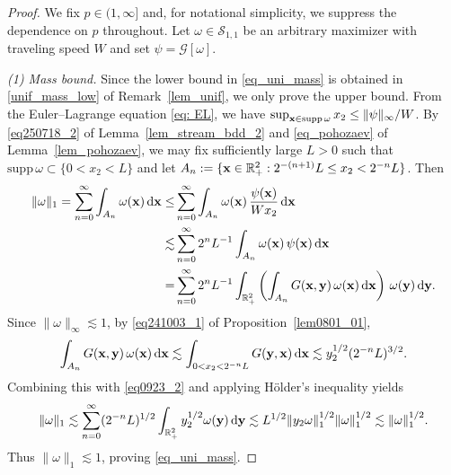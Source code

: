 \documentclass[11pt]{amsart}
\theoremstyle{definition}
\theoremstyle{definition}
\numberwithin{equation}{section}
\newcommand{\set}[1]{\{#1\}}
\newcommand{\supp}{{\mathrm{supp}}\,}
\newcommand{\0}{\emptyset}
\newcommand{\omg}{\omega}
\newcommand{\bfx}{{\bf x}}
\newcommand{\bfy}{{\bf y}}
\newcommand{\bbR}{\mathbb R}
\newcommand{\calG}{\mathcal G}
\newcommand{\calS}{\mathcal S}
\newcommand{\dd}{\mathrm{d}}
\begin{document}
			\begin{proof}
				We fix $p \in (1, \infty]$ and,
                for notational simplicity, we suppress the dependence on $p$ throughout.
				Let $\omega \in \calS_{1, 1}$ be an arbitrary maximizer with traveling speed $W$ and set $\psi = \calG[\omega]$.
				
				\medskip
				
				
				\noindent \textit{(1) Mass bound.}
				Since the lower bound in \eqref{eq_uni_mass} is obtained in \eqref{unif_mass_low} of Remark~\ref{lem_unif}, we only prove the upper bound.
                {
                From the Euler--Lagrange equation \eqref{eq: EL}, we have $\sup_{\bfx \in \supp \omega} x_2 \le \|\psi\|_{\infty}/W$.
                By \eqref{eq250718_2} of Lemma~\ref{lem_stream_bdd_2} and \eqref{eq_pohozaev} of Lemma~\ref{lem_pohozaev}, we may fix sufficiently large $L > 0$ such that $\supp\omg\subset\set{0<x_2<L}$ and}
				 let $A_n := \{ \bfx \in \bbR^2_+:  2^{-(n+1)}L \le  x_2  < 2^{-n}L \}$.
				Then
				\begin{equation}
					\label{eq0923_2}
					\begin{aligned}
						\| \omega\|_1
						= \sum_{n = 0}^{\infty} \int_{ A_n } \omega(\bfx) \, \dd\bfx  
						\le  &\sum_{n = 0}^{\infty} \int_{ A_n } \omega(\bfx) \,  \frac{\psi(\bfx)}{Wx_2}\, \dd\bfx \\
						\lesssim &\sum_{n = 0}^{\infty} 2^n L^{-1} \int_{ A_n } \omega(\bfx) \, \psi(\bfx)\, \dd\bfx \\
						= &\sum_{n = 0}^{\infty} 2^n L^{-1}  \int_{\bbR^2_+}  \left( \int_{A_n }G(\bfx, \bfy) \, \omega(\bfx)  \, \dd\bfx  \right) \,\omega(\bfy) \, \dd\bfy.
					\end{aligned}
				\end{equation}
				Since $\|\omega\|_{\infty} \lesssim 1$, by \eqref{eq241003_1} of Proposition~\ref{lem0801_01},
				\begin{align*}
					\int_{A_n }G(\bfx, \bfy) \, \omega(\bfx)  \, \dd\bfx \lesssim  \int_{0 < x_2  < 2^{-n}L }G(\bfy, \bfx) \, \dd\bfx 
					\lesssim y_2^{1/2} (2^{-n}L)^{3/2}.
				\end{align*}
				Combining this with \eqref{eq0923_2} and applying H\"older's inequality yields
				\[
				\|\omega\|_1 \lesssim \sum_{n = 0}^{\infty} (2^{-n}L)^{1/2} \int_{\bbR^2_+} y_2^{1/2} \omega(\bfy) \, \dd\bfy \lesssim L^{1/2} \|y_2\omega\|_1^{1/2} \|\omega\|_1^{1/2} \lesssim \|\omega\|_1^{1/2}.
				\]
				Thus $\|\omega\|_1 \lesssim 1$, proving \eqref{eq_uni_mass}.
				

\end{proof}
\end{document}
